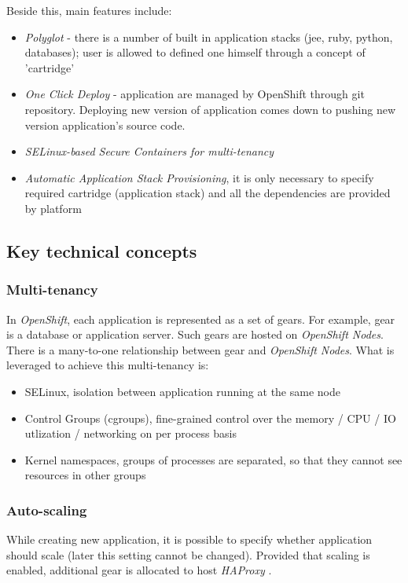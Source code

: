 Beside this, main features include:
\begin{itemize}
  \item \emph{Polyglot} - there is a number of built in application stacks (jee, ruby, python, databases); user is allowed to defined one himself through a concept of 'cartridge'
  \item \emph{One Click Deploy} - application are managed by OpenShift through git repository. Deploying new version of application comes down to pushing new version application's source code.
  \item \emph{SELinux-based Secure Containers for multi-tenancy}
  \item \emph{Automatic Application Stack Provisioning}, it is only necessary to specify required cartridge (application stack) and all the dependencies are provided by platform
\end{itemize}

\subsection{Key technical concepts}

\subsubsection{Multi-tenancy}
In \emph{OpenShift}, each application is represented as a set of gears. For example, gear is a database or application server. Such gears are hosted on \emph{OpenShift Nodes}. There is a many-to-one relationship between gear and \emph{OpenShift Nodes}. What is leveraged to achieve this multi-tenancy is:
\begin{itemize}
 \item SELinux, isolation between application running at the same node
 \item Control Groups (cgroups), fine-grained control over the memory / CPU / IO utlization / networking on per process basis
 \item Kernel namespaces, groups of processes are separated, so that they cannot see resources in other groups
\end{itemize}

\subsubsection{Auto-scaling}
While creating new application, it is possible to specify whether application should scale (later this setting cannot be changed). Provided that scaling is enabled, additional gear is allocated to host \emph{HAProxy} \cite{HAProxy}.

